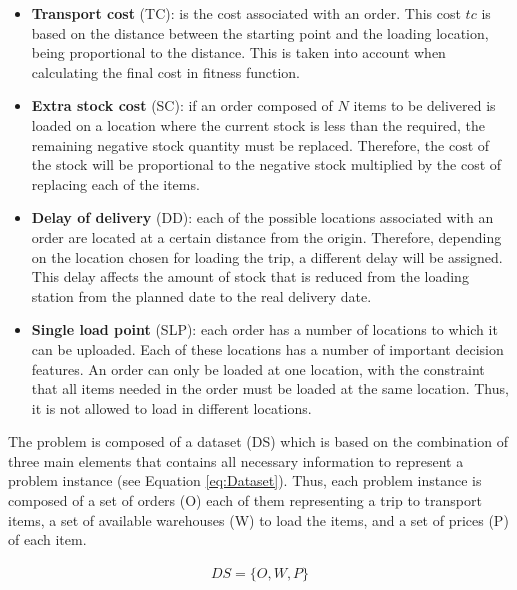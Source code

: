 \documentclass[letterpaper]{article} %
\begin{document}
\begin{itemize}
  \item \textbf{Transport cost }(TC): is the cost associated with an order. This cost $tc$ is based on the distance between the starting point and the loading location, being proportional to the distance. This is taken into account when calculating the final cost in fitness function.
  \item \textbf{Extra stock cost }(SC): if an order composed of $N$ items to be delivered is loaded on a location where the current stock is less than the required, the remaining negative stock quantity must be replaced. Therefore, the cost of the stock will be proportional to the negative stock multiplied by the cost of replacing each of the items.
  \item \textbf{Delay of delivery }(DD): each of the possible locations associated with an order are located at a certain distance from the origin. Therefore, depending on the location chosen for loading the trip, a different delay will be assigned. This delay affects the amount of stock that is reduced from the loading station from the planned date to the real delivery date.
  \item \textbf{Single load point }(SLP): each order has a number of locations to which it can be uploaded. Each of these locations has a number of important decision features. An order can only be loaded at one location, with the constraint that all items needed in the order must be loaded at the same location. Thus, it is not allowed to load in different locations.
\end{itemize}

The problem is composed of a dataset (DS) which is based on the combination of three main elements that contains all necessary information to represent a problem instance (see Equation \ref{eq:Dataset}). Thus, each problem instance is composed of a set of orders (O) each of them representing a trip to transport items, a set of available warehouses (W) to load the items, and a set of prices (P) of each item.

\begin{equation}\label{eq:Dataset}
    \begin{aligned}
        DS = \{O, W, P\} \\
    \end{aligned}
\end{equation}
\end{document}
